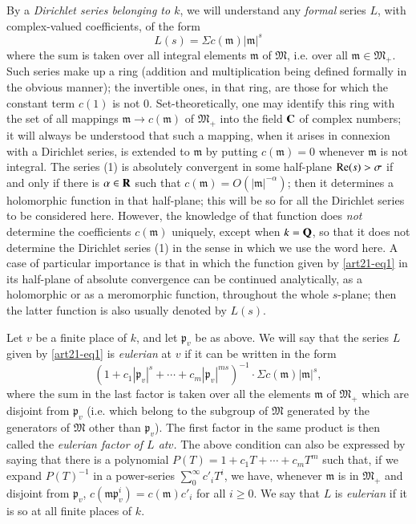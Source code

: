 By a {\em Dirichlet series belonging to $k$}, we will understand any {\em formal} series $L$, with complex-valued coefficients, of the form
\begin{equation}
L(s)=\Sigma c(\mathfrak{m})|\mathfrak{m}|^{s}\label{art21-eq1}
\end{equation}
where the sum is taken over all integral elements $\mathfrak{m}$ of $\mathfrak{M}$, i.e. over all $\mathfrak{m}\in \mathfrak{M}_{+}$. Such series make up a ring (addition and multiplication being defined formally in the obvious manner); the invertible ones, in that ring, are those for which the constant term $c(1)$ is not $0$. Set-theoretically, one may identify this ring with the set of all mappings $\mathfrak{m}\to c(\mathfrak{m})$ of $\mathfrak{M}_{+}$ into the field $\mathbf{C}$ of complex numbers; it will always be understood that such a mapping, when it arises in connexion with a Dirichlet series, is extended to $\mathfrak{m}$ by putting $c(\mathfrak{m})=0$ whenever $\mathfrak{m}$ is not integral. The series (1) is absolutely convergent in some half-plane $\operatorname{\mathrm{Re}}(s)>\sigma$ if and only if there is $\alpha\in \mathbf{R}$ such that $c(\mathfrak{m})=O(|\mathfrak{m}|^{-\alpha})$; then it determines a holomorphic function in that half-plane; this will be so for all the Dirichlet series to be considered here. However, the knowledge of that function does {\em not} determine the coefficients $c(\mathfrak{m})$ uniquely, except when $k=\mathbf{Q}$, so that it does not determine the Dirichlet series (1) in the sense in which we use the word here. A case of particular importance is that in which the function given by \eqref{art21-eq1} in its half-plane of absolute convergence can be continued analytically, as a holomorphic or as a meromorphic function, throughout the whole $s$-plane; then the latter function is also usually denoted by $L(s)$.

Let $v$ be a finite place of $k$, and let $\mathfrak{p}_{v}$ be as above. We will say that the series $L$ given by \eqref{art21-eq1} is {\em eulerian} at $v$ if it can be written in the form
$$
(1+c_{1}|\mathfrak{p}_{v}|^{s}+\cdots+c_{m}|\mathfrak{p}_{v}|^{ms})^{-1}\cdot \Sigma c(\mathfrak{m})|\mathfrak{m}|^{s},
$$
where the sum in the last factor is taken over all the elements $\mathfrak{m}$ of $\mathfrak{M}_{+}$ which are disjoint from $\mathfrak{p}_{v}$ (i.e. which belong to the subgroup of $\mathfrak{M}$ generated by the generators of $\mathfrak{M}$ other than $\mathfrak{p}_{v}$). The first factor in the same product is then called the {\em eulerian factor of $L$ at\pageoriginale $v$.} The above condition can also be expressed by saying that there is a polynomial $P(T)=1+c_{1}T+\cdots+c_{m}T^{m}$ such that, if we expand $P(T)^{-1}$ in a power-series $\sum\limits^{\infty}_{0}c'_{i}T^{i}$, we have, whenever $\mathfrak{m}$ is in $\mathfrak{M}_{+}$ and disjoint from $\mathfrak{p}_{v}$, $c(\mathfrak{m}\mathfrak{p}^{i}_{v})=c(\mathfrak{m})c'_{i}$ for all $i\geq 0$. We say that $L$ is {\em eulerian} if it is so at all finite places of $k$.

